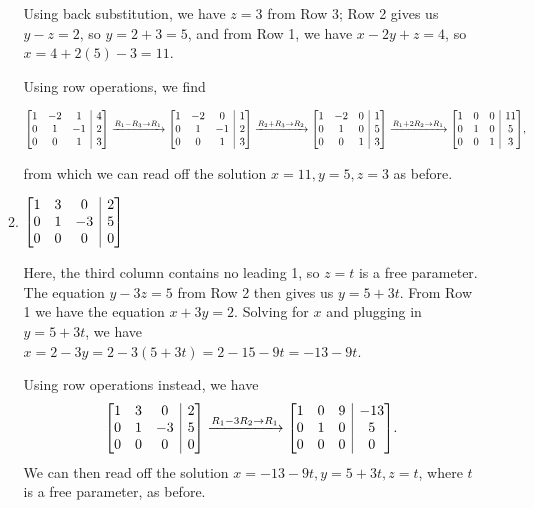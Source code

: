 \documentclass[12pt]{article}
\makeatletter
\newenvironment{amatrix}[1]{%
  \left[\begin{array}{@{}*{#1}{c}|c@{}}
}{%
  \end{array}\right]
}
\makeatother
\begin{document}
\begin{enumerate}
\begin{enumerate}
\bigskip

Using back substitution, we have $z=3$ from Row 3; Row 2 gives us $y-z=2$, so $y=2+3=5$, and from Row 1, we have $x-2y+z=4$, so $x=4+2(5)-3 = 11$.

\medskip

Using row operations, we find

\hglue-48pt\begin{minipage}{\textwidth}
\[
 \begin{amatrix}{3}1&-2&1&4\\0&1&-1&2\\0&0&1&3\end{amatrix}\xrightarrow{\scriptsize{R_1-R_3\to R_1}} \begin{amatrix}{3}1&-2&0&1\\0&1&-1&2\\0&0&1&3\end{amatrix}
\xrightarrow{\scriptsize{R_2+R_3\to R_2}}\begin{amatrix}{3}1&-2&0&1\\0&1&0&5\\0&0&1&3\end{amatrix}\xrightarrow{\scriptsize{R_1+2R_2\to R_1}}
\begin{amatrix}{3}1&0&0&11\\0&1&0&5\\0&0&1&3\end{amatrix},                                                                        
\]
\end{minipage}

\medskip

from which we can read off the solution $x=11, y=5, z=3$ as before.

\bigskip

 \item $\begin{amatrix}{3}1&3&0&2\\0&1&-3&5\\0&0&0&0\end{amatrix}$ 

\bigskip

Here, the third column contains no leading 1, so $z=t$ is a free parameter. The equation $y-3z=5$ from  Row 2 then gives us $y=5+3t$. From Row 1 we have the equation $x+3y=2$. Solving for $x$ and plugging in $y=5+3t$, we have $x=2-3y=2-3(5+3t) = 2-15-9t = -13-9t$. 

\medskip

Using row operations instead, we have
\[
 \begin{amatrix}{3}1&3&0&2\\0&1&-3&5\\0&0&0&0\end{amatrix}\xrightarrow{\scriptsize{R_1-3R_2\to R_1}}\begin{amatrix}{3}1&0&9&-13\\0&1&0&5\\0&0&0&0\end{amatrix}.
\]
We can then read off the solution $x=-13-9t, y=5+3t, z=t$, where $t$ is a free parameter, as before.


\end{enumerate}
\end{enumerate}
\end{document}
